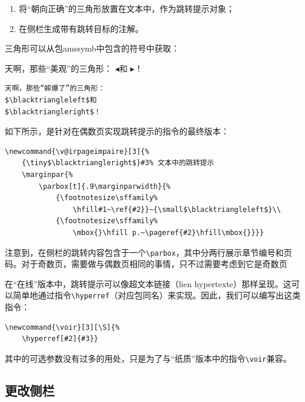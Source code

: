 \begin{enumerate}
    \item 将“朝向正确”的三角形放置在文本中，作为跳转提示对象；
    \item 在侧栏生成带有跳转目标的注解。
\end{enumerate}

三角形可以从包\textsf{amssymb}中包含的符号中获取：

\begin{codelist}[11.4]{
    天啊，那些“美观”的三角形：
$\blacktriangleleft$和
$\blacktriangleright$！
}
\begin{verbatim}
天啊，那些“蟀爆了”的三角形：
$\blacktriangleleft$和
$\blacktriangleright$！\end{verbatim}
\end{codelist}

如下所示，是针对在偶数页实现跳转提示的指令的最终版本：

\begin{dmd}
\begin{verbatim}
\newcommand{\v@irpageimpaire}[3]{% 
    {\tiny$\blacktriangleright$}#3% 文本中的跳转提示
    \marginpar{%
        \parbox[t]{.9\marginparwidth}{% 
            {\footnotesize\sffamily%
                \hfill#1~\ref{#2}}~{\small$\blacktriangleleft$}\\
            {\footnotesize\sffamily%
                \mbox{}\hfill p.~\pageref{#2}\hfill\mbox{}}}}\end{verbatim}
\end{dmd}%

注意到，在侧栏的跳转内容包含于一个\verb|\parbox|，其中分两行展示章节编号和页码。对于奇数页，需要做与偶数页相同的事情，只不过需要考虑到它是奇数页\dm{:-)}

在“在线”版本中，跳转提示可以像超文本链接（lien hypertexte）那样呈现。这可以简单地通过指令\verb|\hyperref|（对应包同名）来实现。因此，我们可以编写出这类指令：

\begin{dmd}
\begin{verbatim}
\newcommand{\voir}[3][\S]{% 
    \hyperref[#2]{#3}}\end{verbatim}
\end{dmd}

其中的可选参数没有过多的用处，只是为了与“纸质”版本中的指令\verb+\voir+兼容。

\subsection{更改侧栏}

